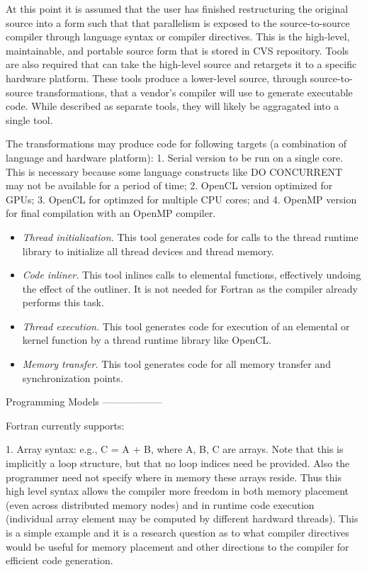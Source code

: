 At this point it is assumed that the user has finished restructuring the
original source into a form such that that parallelism is exposed to the
source-to-source compiler through language syntax or compiler directives.  This
is the high-level, maintainable, and portable source form that is stored in CVS
repository.  Tools are also required that can take the high-level source and
retargets it to a specific hardware platform.  These tools produce a lower-level
source, through source-to-source transformations, that a vendor's compiler will
use to generate executable code.  While described as separate tools, they will
likely be aggragated into a single tool.

The transformations may produce code for following targets (a combination of
language and hardware platform): 1. Serial version to be run on a single core.
This is necessary because some language constructs like DO CONCURRENT may not be
available for a period of time; 2. OpenCL version optimized for GPUs; 3. OpenCL
for optimzed for multiple CPU cores; and 4. OpenMP version for final compilation
with an OpenMP compiler.


\begin{itemize}

\item \emph{Thread initialization.} This tool generates code for calls to the
thread runtime library to initialize all thread devices and thread memory.

\item \emph{Code inliner.} This tool inlines calls to elemental functions,
effectively undoing the effect of the outliner. It is not needed for Fortran as
the compiler already performs this task.

\item \emph{Thread execution.} This tool generates code for execution of an
elemental or kernel function by a thread runtime library like OpenCL.

\item \emph{Memory transfer.}  This tool generates code for all memory transfer
and synchronization points.

\end{itemize}


Programming Models
------------------

Fortran currently supports:

1. Array syntax: e.g., C = A + B, where A, B, C are arrays.  Note that this is implicitly a loop structure, but that no loop indices need be provided.  Also the programmer need not specify where in memory these arrays reside.  Thus this high level syntax allows the compiler more freedom in both memory placement (even across distributed memory nodes) and in runtime code execution (individual array element may be computed by different hardward threads).  This is a simple example and it is a research question as to what compiler directives would be useful for memory placement and other directions to the compiler for efficient code generation.

